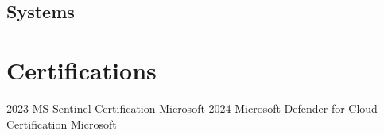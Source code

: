 \subsection{Systems}


\section{Certifications}

\begin{entrylist}
\entry
  {2023}
  {MS Sentinel Certification}
  {Microsoft}
  {}
  {}
\entry
  {2024}
  {Microsoft Defender for Cloud Certification}
  {Microsoft}
  {}
  {}
\end{entrylist}



